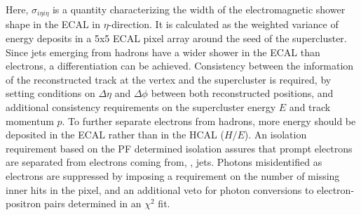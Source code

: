 Here, $\sigma_{i\eta i\eta}$ is a quantity characterizing the width of the electromagnetic shower shape in the ECAL in $\eta$-direction. It is calculated as the weighted variance of energy deposits in a 5x5 ECAL pixel array around the seed of the supercluster. Since jets emerging from hadrons have a wider shower in the ECAL than electrons, a differentiation can be achieved. Consistency between the information of the reconstructed track at the vertex and the supercluster is required, by setting conditions on $\Delta\eta$ and $\Delta\phi$ between both reconstructed positions, and additional consistency requirements on the supercluster energy $E$ and track momentum $p$. To further separate electrons from hadrons, more energy should be deposited in the ECAL rather than in the HCAL ($H/E$). An isolation requirement based on the PF determined isolation assures that prompt electrons are separated from electrons coming from, \eg, jets. Photons misidentified as electrons are suppressed by imposing a requirement on the number of missing inner hits in the pixel, and an additional veto for photon conversions to electron-positron pairs determined in an $\chi^2$ fit.
\

